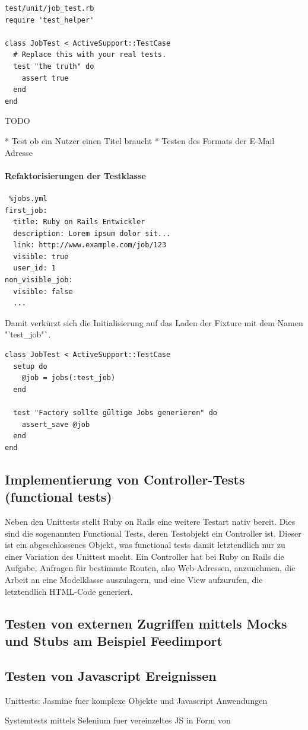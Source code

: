 \begin{lstlisting}
test/unit/job_test.rb 
require 'test_helper'

class JobTest < ActiveSupport::TestCase
  # Replace this with your real tests.
  test "the truth" do
    assert true
  end
end
\end{lstlisting}



TODO 

* Test ob ein Nutzer einen Titel braucht
* Testen des Formats der E-Mail Adresse




\paragraph{Refaktorisierungen der Testklasse}


\begin{lstlisting}
 %jobs.yml
first_job:
  title: Ruby on Rails Entwickler
  description: Lorem ipsum dolor sit...
  link: http://www.example.com/job/123
  visible: true
  user_id: 1
non_visible_job:
  visible: false
  ...
\end{lstlisting}

Damit verkürzt sich die Initialisierung auf das Laden der Fixture mit dem Namen "'test\_job"`.

\begin{lstlisting}
class JobTest < ActiveSupport::TestCase
  setup do
    @job = jobs(:test_job)
  end

  test "Factory sollte gültige Jobs generieren" do
    assert_save @job
  end
end
\end{lstlisting}


\subsection{Implementierung von Controller-Tests (functional tests)}

Neben den Unittests stellt Ruby on Rails eine weitere Testart nativ bereit. Dies sind die sogenannten Functional Tests, deren Testobjekt ein Controller ist. Dieser ist ein abgeschlossenes Objekt, was functional tests damit letztendlich nur zu einer Variation des Unittest macht.
Ein Controller hat bei Ruby on Rails die Aufgabe, Anfragen für bestimmte Routen, also Web-Adressen, anzunehmen, die Arbeit an eine Modelklasse auszulagern, und eine View aufzurufen, die letztendlich HTML-Code generiert.
    
    
\subsection{Testen von externen Zugriffen mittels Mocks und Stubs am Beispiel Feedimport}


\subsection{Testen von Javascript Ereignissen}

Unittests:  Jasmine fuer komplexe Objekte und Javascript Anwendungen

Systemtests mittels Selenium fuer vereinzeltes JS in Form von


